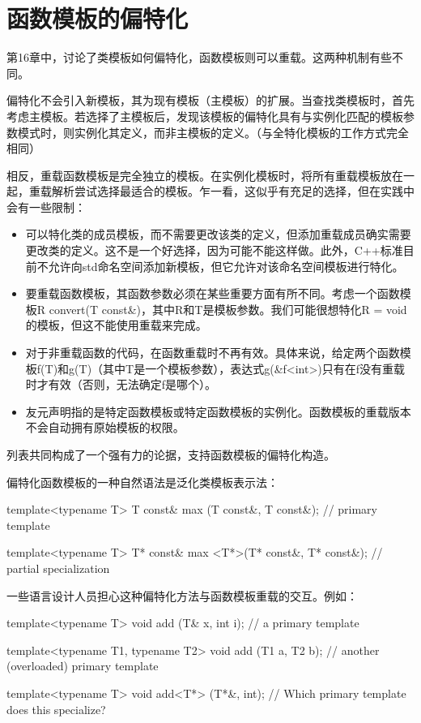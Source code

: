 \section{函数模板的偏特化}

第16章中，讨论了类模板如何偏特化，函数模板则可以重载。这两种机制有些不同。

偏特化不会引入新模板，其为现有模板（主模板）的扩展。当查找类模板时，首先考虑主模板。若选择了主模板后，发现该模板的偏特化具有与实例化匹配的模板参数模式时，则实例化其定义，而非主模板的定义。（与全特化模板的工作方式完全相同）

相反，重载函数模板是完全独立的模板。在实例化模板时，将所有重载模板放在一起，重载解析尝试选择最适合的模板。乍一看，这似乎有充足的选择，但在实践中会有一些限制：

\begin{itemize}
\item 
可以特化类的成员模板，而不需要更改该类的定义，但添加重载成员确实需要更改类的定义。这不是一个好选择，因为可能不能这样做。此外，C++标准目前不允许向std命名空间添加新模板，但它允许对该命名空间模板进行特化。

\item 
要重载函数模板，其函数参数必须在某些重要方面有所不同。考虑一个函数模板R convert(T const\&)，其中R和T是模板参数。我们可能很想特化R = void的模板，但这不能使用重载来完成。

\item 
对于非重载函数的代码，在函数重载时不再有效。具体来说，给定两个函数模板f(T)和g(T)（其中T是一个模板参数），表达式g(\&f<int>)只有在f没有重载时才有效（否则，无法确定f是哪个）。

\item 
友元声明指的是特定函数模板或特定函数模板的实例化。函数模板的重载版本不会自动拥有原始模板的权限。
\end{itemize}

列表共同构成了一个强有力的论据，支持函数模板的偏特化构造。

偏特化函数模板的一种自然语法是泛化类模板表示法：

\begin{cpp}
template<typename T>
T const& max (T const&, T const&); // primary template

template<typename T>
T* const& max <T*>(T* const&, T* const&); // partial specialization
\end{cpp}

一些语言设计人员担心这种偏特化方法与函数模板重载的交互。例如：

\begin{cpp}
template<typename T>
void add (T& x, int i); // a primary template

template<typename T1, typename T2>
void add (T1 a, T2 b); // another (overloaded) primary template

template<typename T>
void add<T*> (T*&, int); // Which primary template does this specialize?
\end{cpp}

